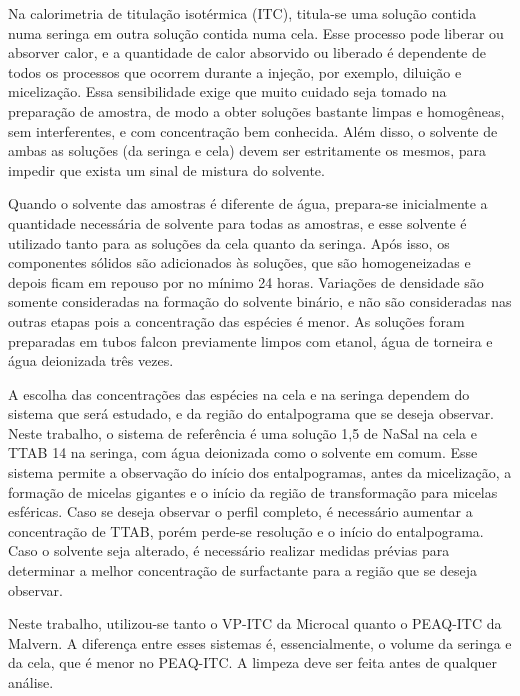 		
		Na calorimetria de titulação isotérmica (ITC), titula-se uma solução contida numa seringa em outra solução contida numa cela. Esse processo pode liberar ou absorver calor, e a quantidade de calor absorvido ou liberado é dependente de todos os processos que ocorrem durante a injeção, por exemplo, diluição e micelização. Essa sensibilidade exige que muito cuidado seja tomado na preparação de amostra, de modo a obter soluções bastante limpas e homogêneas, sem interferentes, e com concentração bem conhecida. Além disso, o solvente de ambas as soluções (da seringa e cela) devem ser estritamente os mesmos, para impedir que exista um sinal de mistura do solvente.
		
		Quando o solvente das amostras é diferente de água, prepara-se inicialmente a quantidade necessária de solvente para todas as amostras, e esse solvente é utilizado tanto para as soluções da cela quanto da seringa. Após isso, os componentes sólidos são adicionados às soluções, que são homogeneizadas e depois ficam em repouso por no mínimo 24 horas. Variações de densidade são somente consideradas na formação do solvente binário, e não são consideradas nas outras etapas pois a concentração das espécies é menor. As soluções foram preparadas em tubos falcon previamente limpos com etanol, água de torneira e água deionizada três vezes.
		
		A escolha das concentrações das espécies na cela e na seringa dependem do sistema que será estudado, e da região do entalpograma que se deseja observar. Neste trabalho, o sistema de referência é uma solução 1,5 \mM{} de NaSal na cela e TTAB 14 \mM{} na seringa, com água deionizada como o solvente em comum. Esse sistema permite a observação do início dos entalpogramas, antes da micelização, a formação de micelas gigantes e o início da região de transformação para micelas esféricas. Caso se deseja observar o perfil completo, é necessário aumentar a concentração de TTAB, porém perde-se resolução e o início do entalpograma. Caso o solvente seja alterado, é necessário realizar medidas prévias para determinar a melhor concentração de surfactante para a região que se deseja observar.
		
		Neste trabalho, utilizou-se tanto o VP-ITC da Microcal quanto o PEAQ-ITC da Malvern. A diferença entre esses sistemas é, essencialmente, o volume da seringa e da cela, que é menor no PEAQ-ITC. A limpeza deve ser feita antes de qualquer análise.
		
